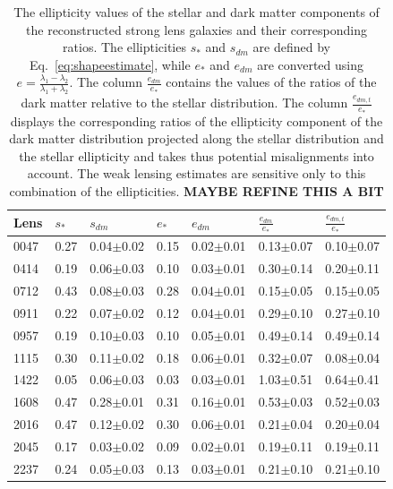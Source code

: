 \documentclass[useAMS,usenatbib]{mn2e}
\begin{document}
\begin{table}
  \begin{center}
    \begin{tabular}{l | l l l l l l}
      Lens & $s_{*}$ & $s_{dm}$ & $e_{*}$ & $e_{dm}$ & $\frac{e_{dm}}{e_{*}}$ & $\frac{e_{dm,t}}{e_{*}}$ \\ \hline
      0047 & 0.27 & 0.04$\pm$0.02 & 0.15 & 0.02$\pm$0.01 & 0.13$\pm$0.07 & 0.10$\pm$0.07 \\
      0414 & 0.19 & 0.06$\pm$0.03 & 0.10 & 0.03$\pm$0.01 & 0.30$\pm$0.14 & 0.20$\pm$0.11 \\
      0712 & 0.43 & 0.08$\pm$0.03 & 0.28 & 0.04$\pm$0.01 & 0.15$\pm$0.05 & 0.15$\pm$0.05 \\
      0911 & 0.22 & 0.07$\pm$0.02 & 0.12 & 0.04$\pm$0.01 & 0.29$\pm$0.10 & 0.27$\pm$0.10 \\
      0957 & 0.19 & 0.10$\pm$0.03 & 0.10 & 0.05$\pm$0.01 & 0.49$\pm$0.14 & 0.49$\pm$0.14 \\
      1115 & 0.30 & 0.11$\pm$0.02 & 0.18 & 0.06$\pm$0.01 & 0.32$\pm$0.07 & 0.08$\pm$0.04 \\
      1422 & 0.05 & 0.06$\pm$0.03 & 0.03 & 0.03$\pm$0.01 & 1.03$\pm$0.51 & 0.64$\pm$0.41 \\
      1608 & 0.47 & 0.28$\pm$0.01 & 0.31 & 0.16$\pm$0.01 & 0.53$\pm$0.03 & 0.52$\pm$0.03 \\
      2016 & 0.47 & 0.12$\pm$0.02 & 0.30 & 0.06$\pm$0.01 & 0.21$\pm$0.04 & 0.20$\pm$0.04 \\
      2045 & 0.17 & 0.03$\pm$0.02 & 0.09 & 0.02$\pm$0.01 & 0.19$\pm$0.11 & 0.19$\pm$0.11 \\
      2237 & 0.24 & 0.05$\pm$0.03 & 0.13 & 0.03$\pm$0.01 & 0.21$\pm$0.10 & 0.21$\pm$0.10 \\
    \end{tabular}
    \caption[width=\linewidth]{The ellipticity values of the stellar and dark matter components of the reconstructed strong lens galaxies and their corresponding ratios. The ellipticities $s_{*}$ and $s_{dm}$ are defined by Eq.~\ref{eq:shapeestimate}, while $e_{*}$ and $e_{dm}$ are converted using $e = \frac{\lambda_1-\lambda_2}{\lambda_1+\lambda_2}$. The column $\frac{e_{dm}}{e_{*}}$ contains the values of the ratios of the dark matter relative to the stellar distribution. The column $\frac{e_{dm,t}}{e_{*}}$ displays the corresponding ratios of the ellipticity component of the dark matter distribution projected along the stellar distribution and the stellar ellipticity and takes thus potential misalignments into account. The weak lensing estimates are sensitive only to this combination of the ellipticities. \textbf{MAYBE REFINE THIS A BIT}}
    \label{tab:ellipratios}
  \end{center}
\end{table}
\end{document}
